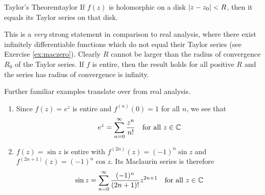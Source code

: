 \begin{thm}{Taylor's Theorem}{taylor}
If $f(z)$ is holomorphic on a disk $\left| z-z_0\right|<R$, then it equals its Taylor series on that disk.
\end{thm}

This is a \emph{very} strong statement in comparison to real analysis, where there exist infinitely differentiable functions which do not equal their Taylor series (see Exercise \ref{ex:maczero}).\smallbreak
Clearly $R$ cannot be larger than the radius of convergence $R_0$ of the Taylor series. If $f$ is entire, then the result holds for all positive $R$ and the series has radius of convergence is infinity.

\begin{examples}{}{}
Further familiar examples translate over from real analysis.
\begin{enumerate}
% 
%   
  \item Since $f(z)=e^z$ is entire and $f^{(n)}(0)=1$ for all $n$, we see that
  \[e^z=\sum\limits_{n=0}^\infty\frac{z^n}{n!}\quad\text{for all }z\in\mathbb{C}\]
  
  \item $f(z)=\sin z$ is entire with $f^{(2n)}(z)=(-1)^n\sin z$ and $f^{(2n+1)}(z)=(-1)^n\cos z$. Its Maclaurin series is therefore
  \[\sin z=\sum\limits_{n=0}^\infty\frac{(-1)^n}{(2n+1)!}z^{2n+1}\quad\text{for all }z\in\mathbb{C}\]
  \goodbreak
  

\end{enumerate}
\end{examples}
